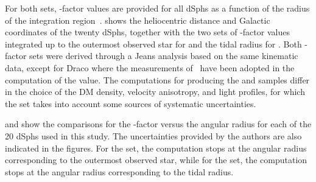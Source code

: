 For both sets, \J-factor values are provided for all dSphs as a function of the radius of the integration region~\cite{Geringer-Sameth:2014yza,Bonnivard:2014kza,Bonnivard:2015xpq}.
 shows the heliocentric distance and Galactic coordinates of the twenty dSphs, together with the two sets of \J-factor values integrated up to the outermost observed star for \GS and the tidal radius for \B.
Both \J-factor sets were derived through a Jeans analysis based on the same kinematic data, except for Draco where the measurements of~\cite{2015MNRAS.448.2717W} have been adopted in the computation of the \B value.
The computations for producing the \GS and \B samples differ in the choice of the DM density, velocity anisotropy, and light profiles, for which the set \B takes into account some sources of systematic uncertainties.

 and  show the comparisons for the \J-factor versus the angular radius for each of the 20 dSphs used in this study.
The uncertainties provided by the authors are also indicated in the figures.
For the \GS set, the computation stops at the angular radius corresponding to the outermost observed star, while for the \B set, the computation stops at the angular radius corresponding to the tidal radius.

